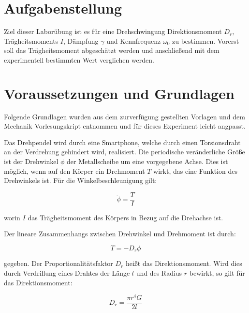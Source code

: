 \documentclass[11pt,ngerman]{scrartcl}
\begin{document}

\tableofcontents
\newpage
\section{Aufgabenstellung}
\label{sec:aufgabenstellung} 

Ziel dieser Laborübung ist es für eine Drehschwingung Direktionsmoment $D_r$,
Trägheitsmoments $I$, Dämpfung $\gamma$ und Kennfrequenz $\omega_0$ zu
bestimmen. Vorerst soll das Trägheitsmoment abgeschätzt werden und anschließend
mit dem experimentell bestimmten Wert verglichen werden. 

\section{Voraussetzungen und Grundlagen} \label{sec:voraussetzungen_grundlagen}
Folgende Grundlagen wurden aus dem zurverfügung gestellten Vorlagen
\cite{tragheitvorlage} und dem Mechanik Vorlesungskript \cite{knoll2020}
entnommen und für dieses Experiment leicht angpasst.

Das Drehpendel wird durch eine Smartphone, welche durch einen Torsionsdraht an
der Verdrehung gehindert wird, realisiert. Die periodische veränderliche Größe
ist der Drehwinkel $\phi$ der Metallscheibe um eine vorgegebene Achse. Dies ist
möglich, wenn auf den Körper ein Drehmoment $T$ wirkt, das eine Funktion des
Drehwinkels ist. Für die Winkelbeschleunigung gilt:

\begin{equation}
    \ddot \phi = \frac{T}{I} 
\end{equation}

worin $I$ das Trägheitsmoment des Körpers in Bezug auf die Drehachse ist.

Der lineare Zusammenhangs zwischen Drehwinkel und Drehmoment ist durch:

\begin{equation}
    T = -D_r \phi
\end{equation}

gegeben. Der Proportionalitätsfaktor $D_r$ heißt das Direktionsmoment. Wird dies durch
Verdrillung eines Drahtes der Länge $l$ und des Radius $r$ bewirkt, so gilt für das
Direktionsmoment:

\begin{equation}
    D_r = \frac{\pi r^4 G}{2l} \label{eq:direktion}
\end{equation}
\end{document}
